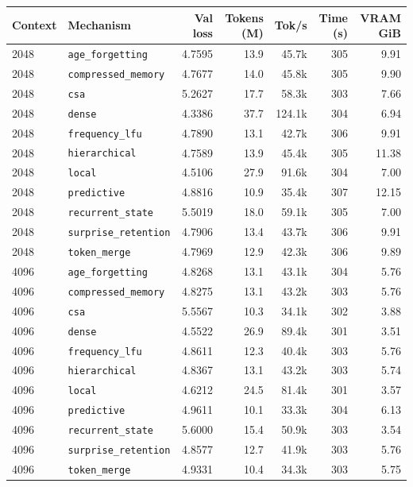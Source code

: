 \begin{tabular}{@{}llrrrrr@{}}
\toprule
Context & Mechanism & Val loss & Tokens (M) & Tok/s & Time (s) & VRAM GiB \\
\midrule
2048 & \texttt{age\_forgetting} & 4.7595 & 13.9 & 45.7k & 305 & 9.91 \\
2048 & \texttt{compressed\_memory} & 4.7677 & 14.0 & 45.8k & 305 & 9.90 \\
2048 & \texttt{csa} & 5.2627 & 17.7 & 58.3k & 303 & 7.66 \\
2048 & \texttt{dense} & 4.3386 & 37.7 & 124.1k & 304 & 6.94 \\
2048 & \texttt{frequency\_lfu} & 4.7890 & 13.1 & 42.7k & 306 & 9.91 \\
2048 & \texttt{hierarchical} & 4.7589 & 13.9 & 45.4k & 305 & 11.38 \\
2048 & \texttt{local} & 4.5106 & 27.9 & 91.6k & 304 & 7.00 \\
2048 & \texttt{predictive} & 4.8816 & 10.9 & 35.4k & 307 & 12.15 \\
2048 & \texttt{recurrent\_state} & 5.5019 & 18.0 & 59.1k & 305 & 7.00 \\
2048 & \texttt{surprise\_retention} & 4.7906 & 13.4 & 43.7k & 306 & 9.91 \\
2048 & \texttt{token\_merge} & 4.7969 & 12.9 & 42.3k & 306 & 9.89 \\
4096 & \texttt{age\_forgetting} & 4.8268 & 13.1 & 43.1k & 304 & 5.76 \\
4096 & \texttt{compressed\_memory} & 4.8275 & 13.1 & 43.2k & 303 & 5.76 \\
4096 & \texttt{csa} & 5.5567 & 10.3 & 34.1k & 302 & 3.88 \\
4096 & \texttt{dense} & 4.5522 & 26.9 & 89.4k & 301 & 3.51 \\
4096 & \texttt{frequency\_lfu} & 4.8611 & 12.3 & 40.4k & 303 & 5.76 \\
4096 & \texttt{hierarchical} & 4.8367 & 13.1 & 43.2k & 303 & 5.74 \\
4096 & \texttt{local} & 4.6212 & 24.5 & 81.4k & 301 & 3.57 \\
4096 & \texttt{predictive} & 4.9611 & 10.1 & 33.3k & 304 & 6.13 \\
4096 & \texttt{recurrent\_state} & 5.6000 & 15.4 & 50.9k & 303 & 3.54 \\
4096 & \texttt{surprise\_retention} & 4.8577 & 12.7 & 41.9k & 303 & 5.76 \\
4096 & \texttt{token\_merge} & 4.9331 & 10.4 & 34.3k & 303 & 5.75 \\

\end{tabular}
